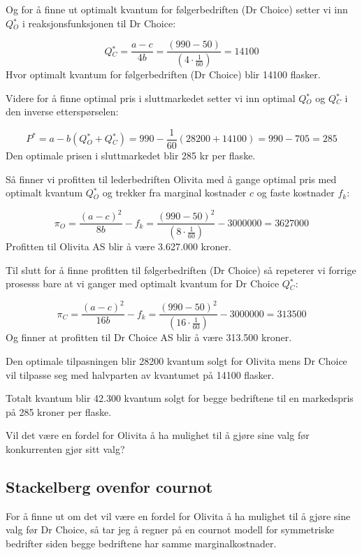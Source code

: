 \documentclass[
  12pt,
  a4paper,
  DIV=11,
  numbers=noendperiod]{scrartcl}
\begin{document}
Og for å finne ut optimalt kvantum for følgerbedriften (Dr Choice)
setter vi inn \(Q{_O^*}\) i reaksjonsfunksjonen til Dr Choice:

\[Q{_C^*} = \frac{a-c}{4b} = \frac{(990 - 50)}{(4 \cdot \frac{1}{60})} = 14100 \tag{6}\]
Hvor optimalt kvantum for følgerbedriften (Dr Choice) blir 14100
flasker.

Videre for å finne optimal pris i sluttmarkedet setter vi inn optimal
\(Q{_O^*}\) og \(Q{_C^*}\) i den inverse etterspørselen:

\[P^* = a - b(Q{_O^*}+Q{_C^*}) = 990 - \frac{1}{60}(28200+14100) = 990 - 705 = 285 \tag{7}\]
Den optimale prisen i sluttmarkedet blir 285 kr per flaske.

Så finner vi profitten til lederbedriften Olivita med å gange optimal
pris med optimalt kvantum \(Q{_O^*}\) og trekker fra marginal kostnader
\(c\) og faste kostnader \(f_k\):

\[ \pi_O = \frac{(a-c)^2}{8b} - f_k =  \frac{(990-50)^2}{(8 \cdot \frac{1}{60})} - 3000000 = 3627000 \tag{8}\]
Profitten til Olivita AS blir å være 3.627.000 kroner.

\clearpage

Til slutt for å finne profitten til følgerbedriften (Dr Choice) så
repeterer vi forrige prosesss bare at vi ganger med optimalt kvantum for
Dr Choice \(Q{_C^*}\):

\[\pi_C = \frac{(a-c)^2}{16b} - f_k =  \frac{(990-50)^2}{(16 \cdot \frac{1}{60})} - 3000000 = 313500 \tag{9}\]
Og finner at profitten til Dr Choice AS blir å være 313.500 kroner.

Den optimale tilpasningen blir 28200 kvantum solgt for Olivita mens Dr
Choice vil tilpasse seg med halvparten av kvantumet på 14100 flasker.

Totalt kvantum blir 42.300 kvantum solgt for begge bedriftene til en
markedspris på 285 kroner per flaske.

Vil det være en fordel for Olivita å ha mulighet til å gjøre sine valg
før konkurrenten gjør sitt valg?

\subsection{Stackelberg ovenfor
cournot}\label{stackelberg-ovenfor-cournot}

For å finne ut om det vil være en fordel for Olivita å ha mulighet til å
gjøre sine valg før Dr Choice, så tar jeg å regner på en cournot modell
for symmetriske bedrifter siden begge bedriftene har samme
marginalkostnader.
\end{document}

